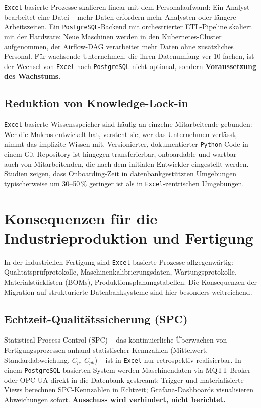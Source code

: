 ﻿\documentclass[12pt,a4paper]{report}
\theoremstyle{definition}
\theoremstyle{remark}
\newcommand{\excel}{\texttt{Excel}}
\newcommand{\pg}{\texttt{PostgreSQL}}
\newcommand{\py}{\texttt{Python}}
\begin{document}
\excel-basierte Prozesse skalieren linear mit dem Personalaufwand:
Ein Analyst bearbeitet eine Datei -- mehr Daten erfordern mehr
Analysten oder längere Arbeitszeiten.
Ein \pg-Backend mit orchestrierter ETL-Pipeline skaliert mit der
Hardware: Neue Maschinen werden in den Kubernetes-Cluster aufgenommen,
der Airflow-DAG verarbeitet mehr Daten ohne zusätzliches Personal.
Für wachsende Unternehmen, die ihren Datenumfang ver-10-fachen, ist
der Wechsel von \excel{} nach \pg{} nicht optional, sondern
\textbf{Voraussetzung des Wachstums}.

\subsection{Reduktion von Knowledge-Lock-in}

\excel-basierte Wissensspeicher sind häufig an einzelne Mitarbeitende
gebunden: Wer die Makros entwickelt hat, versteht sie; wer das
Unternehmen verlässt, nimmt das implizite Wissen mit.
Versionierter, dokumentierter \py-Code in einem Git-Repository ist
hingegen transferierbar, onboardable und wartbar -- auch von
Mitarbeitenden, die nach dem initialen Entwickler eingestellt werden.
Studien zeigen, dass Onboarding-Zeit in datenbankgestützten
Umgebungen typischerweise um 30--50\,\% geringer ist als in
\excel-zentrischen Umgebungen.

\section{Konsequenzen für die Industrieproduktion und Fertigung}

In der industriellen Fertigung sind \excel-basierte Prozesse
allgegenwärtig: Qualitätsprüfprotokolle, Maschinenkalibrierungsdaten,
Wartungsprotokolle, Materialstücklisten (BOMs),
Produktionsplanungstabellen.
Die Konsequenzen der Migration auf strukturierte Datenbanksysteme
sind hier besonders weitreichend.

\subsection{Echtzeit-Qualitätssicherung (SPC)}

Statistical Process Control (SPC) -- das kontinuierliche Überwachen
von Fertigungsprozessen anhand statistischer Kennzahlen (Mittelwert,
Standardabweichung, $C_p$, $C_{pk}$) -- ist in \excel{} nur
retrospektiv realisierbar.
In einem \pg-basierten System werden Maschinendaten via MQTT-Broker
oder OPC-UA direkt in die Datenbank gestreamt; Trigger und
materialisierte Views berechnen SPC-Kennzahlen in Echtzeit;
Grafana-Dashboards visualisieren Abweichungen sofort.
\textbf{Ausschuss wird verhindert, nicht berichtet.}
\end{document}
